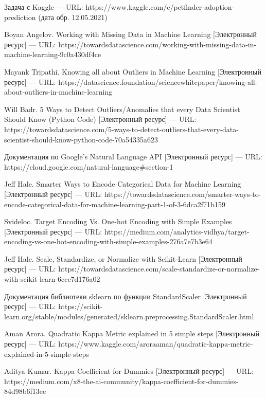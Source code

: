 \documentclass[14pt]{mmcs_article}
\begin{document}
\begin{thebibliography}{0}
Задача с Kaggle --- URL: https://www.kaggle.com/c/petfinder-adoption-prediction (дата обр. 12.05.2021)

Boyan Angelov. Working with Missing Data in Machine Learning  [Электронный ресурс] --- URL:  https://towardsdatascience.com/working-with-missing-data-in-machine-learning-9c0a430df4ce

Mayank Tripathi. Knowing all about Outliers in Machine Learning  [Электронный ресурс] --- URL:  https://datascience.foundation/sciencewhitepaper/knowing-all-about-outliers-in-machine-learning

Will Badr. 5 Ways to Detect Outliers/Anomalies that every Data Scientist Should Know (Python Code) [Электронный ресурс] --- URL: https://towardsdatascience.com/5-ways-to-detect-outliers-that-every-data-scientist-should-know-python-code-70a54335a623

Документация по Google’s Natural Language API [Электронный ресурс] --- URL:  https://cloud.google.com/natural-language\#section-1 

Jeff Hale. Smarter Ways to Encode Categorical Data for Machine Learning  [Электронный ресурс] --- URL:  https://towardsdatascience.com/smarter-ways-to-encode-categorical-data-for-machine-learning-part-1-of-3-6dca2f71b159 

Svideloc. Target Encoding Vs. One-hot Encoding with Simple Examples  [Электронный ресурс] --- URL:  https://medium.com/analytics-vidhya/target-encoding-vs-one-hot-encoding-with-simple-examples-276a7e7b3e64

Jeff Hale. Scale, Standardize, or Normalize with Scikit-Learn [Электронный ресурс] --- URL:  https://towardsdatascience.com/scale-standardize-or-normalize-with-scikit-learn-6ccc7d176a02

Документация библиотеки sklearn по функции StandardScaler  [Электронный ресурс] --- URL:  https://scikit-learn.org/stable/modules/generated/sklearn.preprocessing.StandardScaler.html 

Aman Arora. Quadratic Kappa Metric explained in 5 simple steps  [Электронный ресурс] --- URL:  https://www.kaggle.com/aroraaman/quadratic-kappa-metric-explained-in-5-simple-steps 

Aditya Kumar. Kappa Coefficient for Dummies [Электронный ресурс] --- URL:  https://medium.com/x8-the-ai-community/kappa-coefficient-for-dummies-84d98b6f13ee


\end{thebibliography}
\end{document}

